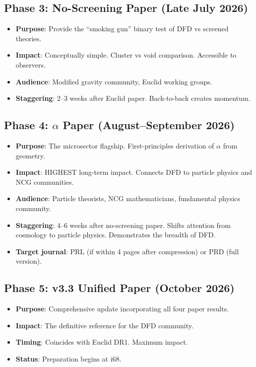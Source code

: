 \documentclass[11pt,a4paper]{article}
\begin{document}
\subsection{Phase 3: No-Screening Paper (Late July 2026)}

\begin{itemize}
\item \textbf{Purpose}: Provide the ``smoking gun'' binary test of DFD vs screened theories.
\item \textbf{Impact}: Conceptually simple. Cluster vs void comparison. Accessible to observers.
\item \textbf{Audience}: Modified gravity community, Euclid working groups.
\item \textbf{Staggering}: 2--3 weeks after Euclid paper. Back-to-back creates momentum.
\end{itemize}

\subsection{Phase 4: $\alpha$ Paper (August--September 2026)}

\begin{itemize}
\item \textbf{Purpose}: The microsector flagship. First-principles derivation of $\alpha$ from geometry.
\item \textbf{Impact}: HIGHEST long-term impact. Connects DFD to particle physics and NCG communities.
\item \textbf{Audience}: Particle theorists, NCG mathematicians, fundamental physics community.
\item \textbf{Staggering}: 4--6 weeks after no-screening paper. Shifts attention from cosmology to particle physics. Demonstrates the breadth of DFD.
\item \textbf{Target journal}: PRL (if within 4 pages after compression) or PRD (full version).
\end{itemize}

\subsection{Phase 5: v3.3 Unified Paper (October 2026)}

\begin{itemize}
\item \textbf{Purpose}: Comprehensive update incorporating all four paper results.
\item \textbf{Impact}: The definitive reference for the DFD community.
\item \textbf{Timing}: Coincides with Euclid DR1. Maximum impact.
\item \textbf{Status}: Preparation begins at i68.
\end{itemize}
\end{document}
